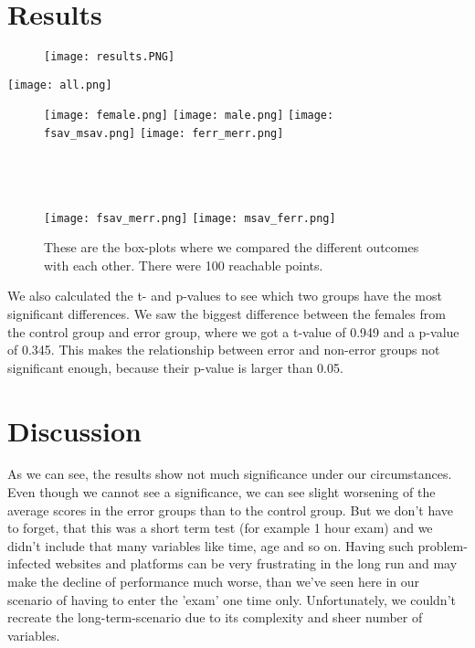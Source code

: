 \documentclass[12pt, a4paper]{article}
\begin{document}
\section{Results}
\begin{figure}[h]
    \texttt{[image: results.PNG]}
\end{figure}
\begin{center}
    \texttt{[image: all.png]}
\end{center}
\begin{figure}[h]
    \texttt{[image: female.png]}
    \texttt{[image: male.png]}
    \texttt{[image: fsav\_msav.png]}
    \texttt{[image: ferr\_merr.png]}\\\\\\\\
\end{figure}
\begin{figure}[h]
    \texttt{[image: fsav\_merr.png]}
    \texttt{[image: msav\_ferr.png]}
    \caption{These are the box-plots where we compared the different outcomes with each other. There were 100 reachable points.}
\end{figure}
We also calculated the t- and p-values to see which two groups have the most significant differences. 
We saw the biggest difference between the females from the control group and error group, where we 
got a t-value of 0.949 and a p-value of 0.345. This makes the relationship between error and 
non-error groups not significant enough, because their p-value is larger than 0.05.   

\section{Discussion}
As we can see, the results show not much significance under our circumstances. Even though we cannot see a significance, we can see slight worsening of the average scores in the error groups than to the control group. But we don't have to forget, that this was a short term test (for example 1 hour exam) and we didn't include that many variables like time, age and so on. Having such problem-infected websites and platforms can be very frustrating in the long run and may make the decline of performance much worse, than we've seen here in our scenario of having to enter the 'exam' one time only.  Unfortunately, we couldn't recreate the long-term-scenario due to its complexity and sheer number of variables.          
\end{document}
